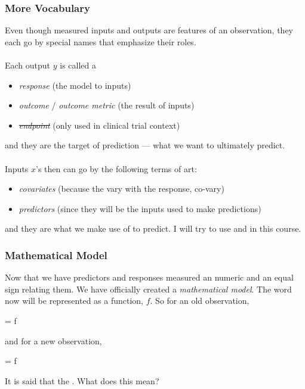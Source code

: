 \documentclass[handout]{beamer}
\begin{document}
\begin{frame}\frametitle{More Vocabulary}

\small
Even though measured inputs and outputs are features of an observation, they each go by special names that emphasize their roles. \\~\\

Each output $y$ is called a

\begin{itemize}
\item \textit{response} (the model  to inputs)
\item \textit{outcome} / \textit{outcome metric} (the result of inputs)
\item \sout{\textit{endpoint}} (only used in clinical trial context)
\end{itemize}

and they are the target of prediction --- what we want to ultimately predict. \\~\\

Inputs $x$'s then can go by the following terms of art:

\begin{itemize}
\item \textit{covariates} (because the vary with the response, co-vary)
\item \textit{predictors} (since they will be the inputs used to make predictions)
\end{itemize}

and they are what we make use of to predict. I will try to use  and  in this course.

\end{frame}


\begin{frame}\frametitle{Mathematical Model}

Now that we have predictors and responses measured an numeric and an equal sign relating them. We have officially created a \textit{mathematical model}. The word  now will be represented as a function, $f$. So for an old observation,

\beqn
{} = f 
\eeqn

and for a new observation,

\beqn
{} = f 
\eeqn

It is said that the . What does this mean?
	
\end{frame}
\end{document}
